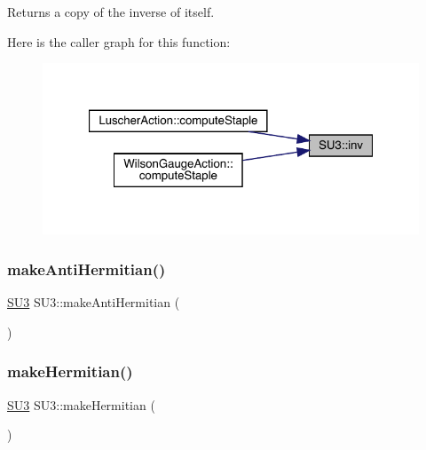 \begin{DoxyReturn}{Returns}
a copy of the inverse of itself. 
\end{DoxyReturn}
Here is the caller graph for this function\+:\nopagebreak
\begin{figure}[H]
\begin{center}
\leavevmode
\includegraphics[width=321pt]{class_s_u3_ad0e19706d3c6fdb50dcf788d4b48eb4c_icgraph}
\end{center}
\end{figure}
\mbox{\label{class_s_u3_a25e7cd46d60f25138585b76115e791a3}} 
\subsubsection{\texorpdfstring{makeAntiHermitian()}{makeAntiHermitian()}}
{\footnotesize\ttfamily \mbox{\hyperlink{class_s_u3}{S\+U3}} S\+U3\+::make\+Anti\+Hermitian (\begin{DoxyParamCaption}{ }\end{DoxyParamCaption})\hspace{0.3cm}{\ttfamily [inline]}}

\mbox{\label{class_s_u3_a7035a3e94f6dd27ece144b42473cade9}} 
\subsubsection{\texorpdfstring{makeHermitian()}{makeHermitian()}}
{\footnotesize\ttfamily \mbox{\hyperlink{class_s_u3}{S\+U3}} S\+U3\+::make\+Hermitian (\begin{DoxyParamCaption}{ }\end{DoxyParamCaption})\hspace{0.3cm}{\ttfamily [inline]}}

